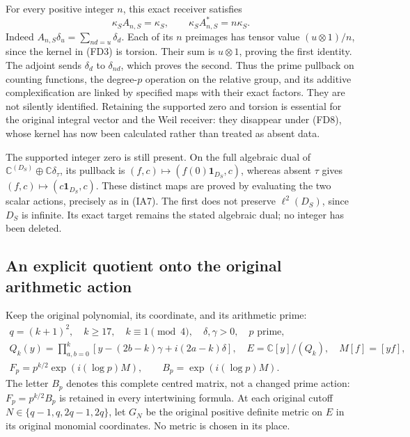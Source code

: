 For every positive integer $n$, this exact receiver satisfies
\[
 \kappa_S A_{n,S}=\kappa_S,\qquad
 \kappa_S A_{n,S}^*=n\kappa_S.
 \tag{FD9}
\]
Indeed $A_{n,S}\delta_u=\sum_{nd=u}\delta_d$. Each of its $n$
preimages has tensor value $(u\otimes1)/n$, since the kernel in
(FD3) is torsion. Their sum is $u\otimes1$, proving the first
identity. The adjoint sends $\delta_d$ to $\delta_{nd}$, which proves
the second. Thus the prime pullback on counting functions, the
degree-$p$ operation on the relative group, and its additive
complexification are linked by specified maps with their exact
factors. They are not silently identified. Retaining the supported
zero and torsion is essential for the original integral vector and
the Weil receiver: they disappear under (FD8), whose kernel has now
been calculated rather than treated as absent data.

The supported integer zero is still present. On the full algebraic
dual of $\mathbb C^{(D_S)}\oplus\mathbb C\delta_\tau$, its pullback is
$(f,c)\mapsto(f(0)\mathbf1_{D_S},c)$, whereas absent $\tau$ gives
$(f,c)\mapsto(c\mathbf1_{D_S},c)$. These distinct maps are proved by
evaluating the two scalar actions, precisely as in (IA7). The first
does not preserve $\ell^2(D_S)$, since $D_S$ is infinite. Its exact
target remains the stated algebraic dual; no integer has been deleted.

\subsection{An explicit quotient onto the original arithmetic action}
Keep the original polynomial, its coordinate, and its arithmetic prime:
\[
 \begin{gathered}
 q=(k+1)^2,\quad k\ge17,\quad k\equiv1\pmod4,
 \quad\delta,\gamma>0,\quad p\text{ prime},\\
 Q_k(y)=\prod_{a,b=0}^k[y-(2b-k)\gamma+i(2a-k)\delta],
 \quad E=\mathbb C[y]/(Q_k),\quad M[f]=[yf],\\
 F_p=p^{k/2}\exp(i(\log p)M),\qquad B_p=\exp(i(\log p)M).
 \end{gathered}\tag{AQ1}
\]
The letter $B_p$ denotes this complete centred matrix, not a changed
prime action: $F_p=p^{k/2}B_p$ is retained in every intertwining formula.
At each original cutoff $N\in\{q-1,q,2q-1,2q\}$, let $G_N$ be
the original positive definite metric on $E$ in its original monomial
coordinates. No metric is chosen in its place.

